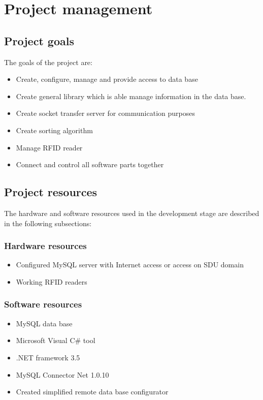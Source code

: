 %
\section{Project management}

\subsection{Project goals}

The goals of the project are:

\begin{itemize}
	\item Create, configure, manage and provide access to data base
	\item Create general library which is able manage information in the data base.
	\item Create socket transfer server for communication purposes
	\item Create sorting algorithm
	\item Manage RFID reader
	\item Connect and control all software parts together
\end{itemize}

\subsection{Project resources}

The hardware and software resources used in the development stage are described in the following subsections:

\subsubsection{Hardware resources}
\begin{itemize}
	\item Configured MySQL server with Internet access or access on SDU domain
	\item Working RFID readers
\end{itemize}

\subsubsection{Software resources}
\begin{itemize}
	\item MySQL data base
	\item Microsoft Visual C\# tool
	\item .NET framework 3.5
	\item MySQL Connector Net 1.0.10
	\item Created simplified remote data base configurator
\end{itemize}

